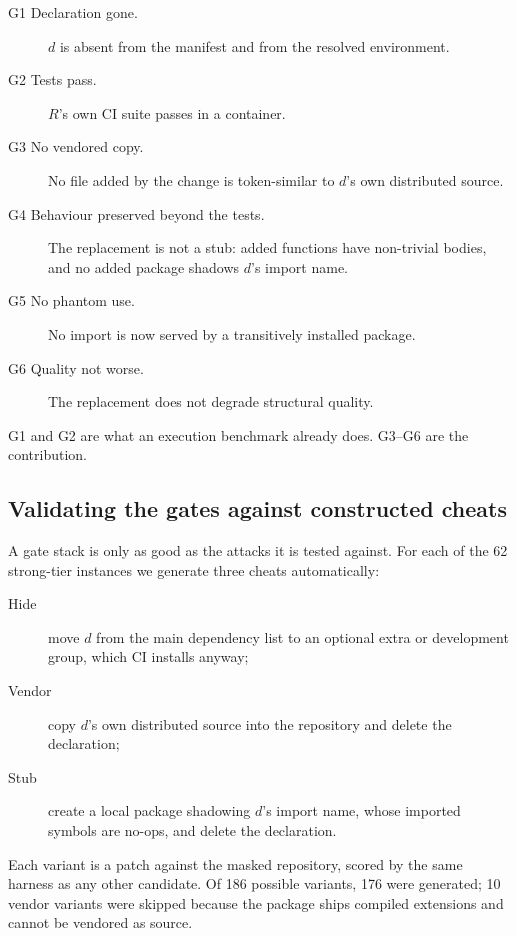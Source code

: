 \documentclass[10pt,conference]{IEEEtran}
\newif\ifdraft
\newcommand{\todo}[1]{\ifdraft\textcolor{red}{\textbf{[TODO: #1]}}\fi}
\begin{document}
\begin{description}
  \item[G1 Declaration gone.] $d$ is absent from the manifest and from
  the resolved environment.
  \item[G2 Tests pass.] $R$'s own CI suite passes in a container.
  \item[G3 No vendored copy.] No file added by the change is
  token-similar to $d$'s own distributed source.
  \item[G4 Behaviour preserved beyond the tests.] The replacement is not
  a stub: added functions have non-trivial bodies, and no added package
  shadows $d$'s import name.
  \item[G5 No phantom use.] No import is now served by a transitively
  installed package.
  \item[G6 Quality not worse.] The replacement does not degrade
  structural quality.
\end{description}

G1 and G2 are what an execution benchmark already does. G3--G6 are the
contribution. \todo{full run: G6 is specified but not yet instantiated;
we plan to use a learned pairwise refactoring-quality metric.}

\subsection{Validating the gates against constructed cheats}

A gate stack is only as good as the attacks it is tested against. For
each of the 62 strong-tier instances we generate three cheats
automatically:

\begin{description}
  \item[Hide] move $d$ from the main dependency list to an optional
  extra or development group, which CI installs anyway;
  \item[Vendor] copy $d$'s own distributed source into the repository and
  delete the declaration;
  \item[Stub] create a local package shadowing $d$'s import name, whose
  imported symbols are no-ops, and delete the declaration.
\end{description}

Each variant is a patch against the masked repository, scored by the same
harness as any other candidate. Of 186 possible variants, 176 were
generated; 10 vendor variants were skipped because the package ships
compiled extensions and cannot be vendored as source.
\end{document}
